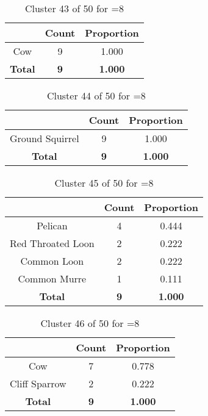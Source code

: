 \begin{table}[ht!]
\centering
\begin{tabular}{|c|c|c|}
\hline
\bf \Spec{} &\bf Count &\bf Proportion\\ \hline \hline
Cow & 9 & 1.000\\ \hline
\hline
\bf Total & \bf 9 & \bf 1.000\\ \hline
\end{tabular}
\label{tab:cluster:43:8}
\caption{Cluster 43 of 50 for \minneigh{}=8}
\end{table}

\begin{table}[ht!]
\centering
\begin{tabular}{|c|c|c|}
\hline
\bf \Spec{} &\bf Count &\bf Proportion\\ \hline \hline
Ground Squirrel & 9 & 1.000\\ \hline
\hline
\bf Total & \bf 9 & \bf 1.000\\ \hline
\end{tabular}
\label{tab:cluster:44:8}
\caption{Cluster 44 of 50 for \minneigh{}=8}
\end{table}

\begin{table}[ht!]
\centering
\begin{tabular}{|c|c|c|}
\hline
\bf \Spec{} &\bf Count &\bf Proportion\\ \hline \hline
Pelican & 4 & 0.444\\ \hline
Red Throated Loon & 2 & 0.222\\ \hline
Common Loon & 2 & 0.222\\ \hline
Common Murre & 1 & 0.111\\ \hline
\hline
\bf Total & \bf 9 & \bf 1.000\\ \hline
\end{tabular}
\label{tab:cluster:45:8}
\caption{Cluster 45 of 50 for \minneigh{}=8}
\end{table}

\begin{table}[ht!]
\centering
\begin{tabular}{|c|c|c|}
\hline
\bf \Spec{} &\bf Count &\bf Proportion\\ \hline \hline
Cow & 7 & 0.778\\ \hline
Cliff Sparrow & 2 & 0.222\\ \hline
\hline
\bf Total & \bf 9 & \bf 1.000\\ \hline
\end{tabular}
\label{tab:cluster:46:8}
\caption{Cluster 46 of 50 for \minneigh{}=8}
\end{table}

